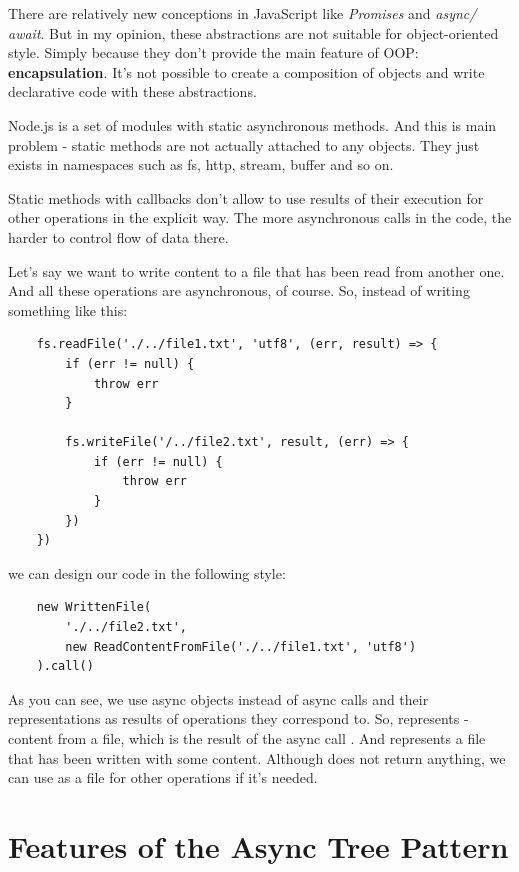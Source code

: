 \documentclass{article}
\begin{document}
There are relatively new conceptions in JavaScript like \textit{Promises} and  \textit{async/ await}. But in my opinion, these abstractions are not suitable for object-oriented style. Simply because they don't provide the main feature of OOP: \textbf{encapsulation}. 
It's not possible to create a composition of objects and write declarative code with these abstractions.

Node.js is a set of modules with static asynchronous methods. And this is main problem - static methods are not actually attached to any objects. They just exists in namespaces such as fs, http, stream, buffer and so on.

Static methods with callbacks don't allow to use results of their execution for other operations in the explicit way. The more asynchronous calls in the code, the harder to control flow of data there.

Let's say we want to write content to a file that has been read from another one. And all these operations are asynchronous, of course. 
So, instead of writing something like this:


\begin{verbatim}
    fs.readFile('./../file1.txt', 'utf8', (err, result) => {
        if (err != null) {
            throw err
        }
 
        fs.writeFile('/../file2.txt', result, (err) => {
            if (err != null) {
                throw err
            }
        })
    })
\end{verbatim}

we can design our code in the following style:


\begin{verbatim}
    new WrittenFile(
        './../file2.txt',
        new ReadContentFromFile('./../file1.txt', 'utf8')
    ).call()
\end{verbatim}

As you can see, we use async objects instead of async calls and their representations as results of operations they correspond to. So,  represents  - content from a file, which is the result of the async call . And  represents a file that has been written with some content. Although  does not return anything, we can use  as a file for other operations if it's needed.

\section{Features of the Async Tree Pattern}
\end{document}
